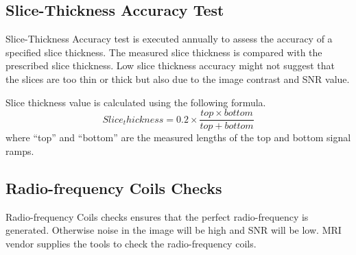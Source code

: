 \documentclass[12pt]{article}
\begin{document}
\subsection{Slice-Thickness Accuracy Test}
Slice-Thickness Accuracy test is executed annually to assess the accuracy of a specified slice thickness. The measured slice thickness is compared with the prescribed slice thickness. Low slice thickness accuracy might not suggest that the slices are too thin or thick but also due to the image contrast and SNR value. 

Slice thickness value is calculated using the following formula.
\begin{equation*}
Slice_thickness = 0.2 \times \frac{top\times bottom}{top + bottom}
\end{equation*}
where “top” and “bottom” are the measured lengths of the top and bottom
signal ramps. 
\subsection{Radio-frequency Coils Checks }
Radio-frequency Coils checks ensures that the perfect radio-frequency is generated. Otherwise noise in the image will be high and SNR will be low. MRI vendor supplies the tools to check the radio-frequency coils. 
\end{document}

